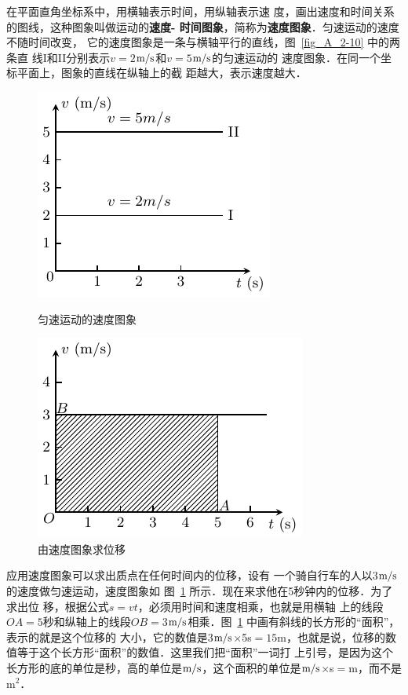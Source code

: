 在平面直角坐标系中，用横轴表示时间，用纵轴表示速
度，画出速度和时间关系的图线，这种图象叫做运动的\textbf{速度-
时间图象}，简称为\textbf{速度图象}．匀速运动的速度不随时间改变，
它的速度图象是一条与横轴平行的直线，图~\ref{fig_A_2-10} 中的两条直
线I和II分别表示$v=2$$\text{m}/\text{s}$和$v=5$$\text{m}/\text{s}$的匀速运动的
速度图象．在同一个坐标平面上，图象的直线在纵轴上的截
距越大，表示速度越大．
\begin{figure}[htp]
    \centering
    \begin{minipage}[t]{0.48\textwidth}
        \centering
        \includegraphics{fig/A/2-10.pdf}
        \caption{匀速运动的速度图象}\label{fig_A_2-10}
    \end{minipage}
    \begin{minipage}[t]{0.48\textwidth}
        \centering
        \includegraphics{fig/A/2-11.pdf}
        \caption{由速度图象求位移}\label{fig_A_2-11}
    \end{minipage}
\end{figure}

应用速度图象可以求出质点在任何时间内的位移，设有
一个骑自行车的人以3$\text{m}/\text{s}$的速度做匀速运动，速度图象如
图~\ref{fig_A_2-11} 所示．现在来求他在5秒钟内的位移．为了求出位
移，根据公式$s=vt$，必须用时间和速度相乘，也就是用横轴
上的线段$OA=5$秒和纵轴上的线段$OB=3$$\text{m}/\text{s}$相乘．图~\ref{fig_A_2-11} 
中画有斜线的长方形的“面积”，表示的就是这个位移的
大小，它的数值是3$\text{m}/\text{s}$$\times$5s$=15$m，也就是说，位移的数
值等于这个长方形“面积”的数值．这里我们把“面积”一词打
上引号，是因为这个长方形的底的单位是秒，高的单位是$\text{m}/\text{s}$，这个面积的单位是$\text{m}/\text{s}$$\times$s$=$m，而不是m$^2$．

